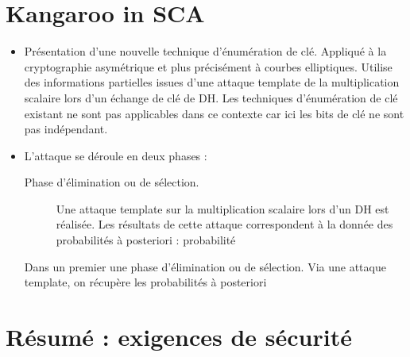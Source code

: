 \documentclass[a4paper]{report}
\begin{document}
\section{Kangaroo in SCA}
\begin{itemize}[label=--]
    \item Présentation d'une nouvelle technique d'énumération de clé. Appliqué à la cryptographie asymétrique et plus précisément à courbes elliptiques. Utilise des informations partielles issues d'une attaque template de la multiplication scalaire lors d'un échange de clé de DH. Les techniques d'énumération de clé existant ne sont pas applicables dans ce contexte car ici les bits de clé ne sont pas indépendant. 
    \item L'attaque se déroule en deux phases :
    \begin{description}
        \item[Phase d'élimination ou de sélection.] Une attaque template sur la multiplication scalaire lors d'un DH est réalisée. Les résultats de cette attaque correspondent à la donnée des probabilités à posteriori : probabilité 
    \end{description}Dans un premier une phase d'élimination ou de sélection. Via une attaque template, on récupère les probabilités à posteriori 
\end{itemize}

\begin{comment}
\section{A faire}
\begin{itemize}
    \item Degré de plongement d'une courbe elliptique.
\end{itemize}

\begin{definition}
    Soit $E(\GF{q})$ une courbe elliptique et $r$ un diviseur premier de $\# E(\GF{q})$. Le \emph{degré de plongement} de $E$ relativement à $r$ est le plus petit entier $k$ tel que $r|q^k - 1$
\end{definition}
\end{comment}

\section{Résumé : exigences de sécurité}
\end{document}
